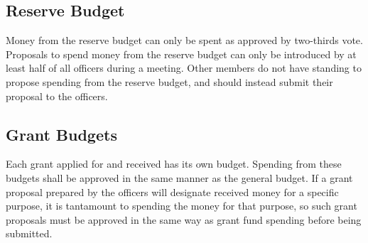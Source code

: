 \documentclass{article}
\begin{document}
\subsection{Reserve Budget}

Money from the reserve budget can only be spent as approved by two-thirds vote.
Proposals to spend money from the reserve budget can only be introduced by at
least half of all officers during a meeting. Other members do not have standing
to propose spending from the reserve budget, and should instead submit their
proposal to the officers.

\subsection{Grant Budgets}

Each grant applied for and received has its own budget. Spending from these
budgets shall be approved in the same manner as the general budget. If a grant
proposal prepared by the officers will designate received money for a specific
purpose, it is tantamount to spending the money for that purpose, so such grant
proposals must be approved in the same way as grant fund spending before being
submitted.
\end{document}
